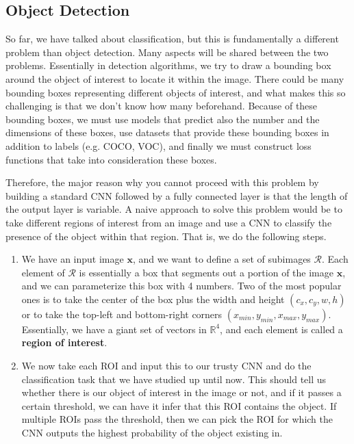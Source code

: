 \documentclass{article}
\theoremstyle{definition}
\theoremstyle{remark}
\theoremstyle{definition}
\begin{document}
  \subsection{Object Detection} 

    So far, we have talked about classification, but this is fundamentally a different problem than object detection. Many aspects will be shared between the two problems. Essentially in detection algorithms, we try to draw a bounding box around the object of interest to locate it within the image. There could be many bounding boxes representing different objects of interest, and what makes this so challenging is that we don't know how many beforehand. Because of these bounding boxes, we must use models that predict also the number and the dimensions of these boxes, use datasets that provide these bounding boxes in addition to labels (e.g. COCO, VOC), and finally we must construct loss functions that take into consideration these boxes. 

    Therefore, the major reason why you cannot proceed with this problem by building a standard CNN followed by a fully connected layer is that the length of the output layer is variable. A naive approach to solve this problem would be to take different regions of interest from an image and use a CNN to classify the presence of the object within that region. That is, we do the following steps. 
    \begin{enumerate}
      \item We have an input image $\mathbf{x}$, and we want to define a set of subimages $\mathcal{R}$. Each element of $\mathcal{R}$ is essentially a box that segments out a portion of the image $\mathbf{x}$, and we can parameterize this box with 4 numbers. Two of the most popular ones is to take the center of the box plus the width and height $(c_x, c_y, w, h)$ or to take the top-left and bottom-right corners $(x_{min}, y_{min}, x_{max}, y_{max})$. Essentially, we have a giant set of vectors in $\mathbb{R}^4$, and each element is called a \textbf{region of interest}. 
      \item We now take each ROI and input this to our trusty CNN and do the classification task that we have studied up until now. This should tell us whether there is our object of interest in the image or not, and if it passes a certain threshold, we can have it infer that this ROI contains the object. If multiple ROIs pass the threshold, then we can pick the ROI for which the CNN outputs the highest probability of the object existing in.  
    \end{enumerate}
\end{document}
